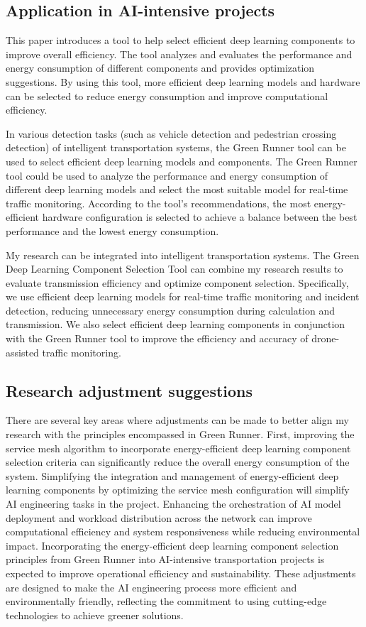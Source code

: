 \documentclass[11pt]{report}
\begin{document}
\subsection{Application in AI-intensive projects}
\label{subsec:integration2}

This paper introduces a tool to help select efficient deep learning components to improve overall efficiency. The tool analyzes and evaluates the performance and energy consumption of different components and provides optimization suggestions. By using this tool, more efficient deep learning models and hardware can be selected to reduce energy consumption and improve computational efficiency.

In various detection tasks (such as vehicle detection and pedestrian crossing detection) of intelligent transportation systems, the Green Runner tool can be used to select efficient deep learning models and components. The Green Runner tool could be used to analyze the performance and energy consumption of different deep learning models and select the most suitable model for real-time traffic monitoring. According to the tool's recommendations, the most energy-efficient hardware configuration is selected to achieve a balance between the best performance and the lowest energy consumption.

My research can be integrated into intelligent transportation systems. The Green Deep Learning Component Selection Tool can combine my research results to evaluate transmission efficiency and optimize component selection. Specifically, we use efficient deep learning models for real-time traffic monitoring and incident detection, reducing unnecessary energy consumption during calculation and transmission. We also select efficient deep learning components in conjunction with the Green Runner tool to improve the efficiency and accuracy of drone-assisted traffic monitoring.

\subsection{Research adjustment suggestions}
\label{adjustment2}

There are several key areas where adjustments can be made to better align my research with the principles encompassed in Green Runner. First, improving the service mesh algorithm to incorporate energy-efficient deep learning component selection criteria can significantly reduce the overall energy consumption of the system. Simplifying the integration and management of energy-efficient deep learning components by optimizing the service mesh configuration will simplify AI engineering tasks in the project. Enhancing the orchestration of AI model deployment and workload distribution across the network can improve computational efficiency and system responsiveness while reducing environmental impact. Incorporating the energy-efficient deep learning component selection principles from Green Runner into AI-intensive transportation projects is expected to improve operational efficiency and sustainability. These adjustments are designed to make the AI engineering process more efficient and environmentally friendly, reflecting the commitment to using cutting-edge technologies to achieve greener solutions.
\end{document}
